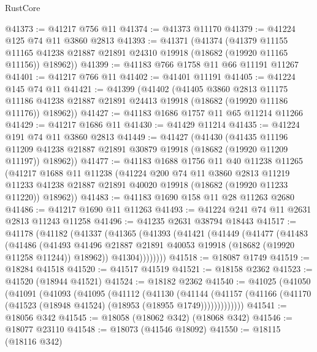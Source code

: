 \begin{lexlean}{RustCore}
\begin{coremodule}
@41373 := @41217 @756 @11
@41374 := @41373 @11170
@41379 := @41224 @125 @74 @11 @3860 @2813
@41393 := @41371
    (@41374
      (@41379
        @11155
        @11165
        @41238
        @21887
        @21891
        @24310
        @19918
        (@18682 (@19920 @11165 @11156))
        @18962))
@41399 := @41183 @766 @1758 @11 @66 @11191 @11267
@41401 := @41217 @766 @11
@41402 := @41401 @11191
@41405 := @41224 @145 @74 @11
@41421 := @41399
    (@41402
      (@41405
        @3860
        @2813
        @11175
        @11186
        @41238
        @21887
        @21891
        @24413
        @19918
        (@18682 (@19920 @11186 @11176))
        @18962))
@41427 := @41183 @1686 @1757 @11 @65 @11214 @11266
@41429 := @41217 @1686 @11
@41430 := @41429 @11214
@41435 := @41224 @191 @74 @11 @3860 @2813
@41449 := @41427
    (@41430
      (@41435
        @11196
        @11209
        @41238
        @21887
        @21891
        @30879
        @19918
        (@18682 (@19920 @11209 @11197))
        @18962))
@41477 := @41183
    @1688
    @1756
    @11
    @40
    @11238
    @11265
    (@41217
      @1688
      @11
      @11238
      (@41224
        @200
        @74
        @11
        @3860
        @2813
        @11219
        @11233
        @41238
        @21887
        @21891
        @40020
        @19918
        (@18682 (@19920 @11233 @11220))
        @18962))
@41483 := @41183 @1690 @158 @11 @28 @11263 @2680
@41486 := @41217 @1690 @11 @11263
@41493 := @41224 @241 @74 @11 @2631 @2813 @11243 @11258
@41496 := @41235 @2631 @38794 @18443
@41517 := @41178
    (@41182
      (@41337
        (@41365
          (@41393
            (@41421
              (@41449
                (@41477
                  (@41483
                    (@41486
                      (@41493
                        @41496
                        @21887
                        @21891
                        @40053
                        @19918
                        (@18682 (@19920 @11258 @11244))
                        @18962))
                    @41304))))))))
@41518 := @18087 @1749
@41519 := @18284 @41518
@41520 := @41517 @41519
@41521 := @18158 @2362
@41523 := @41520 (@18944 @41521)
@41524 := @18182 @2362
@41540 := @41025
    (@41050
      (@41091
        (@41093
          (@41095
            (@41112
              (@41130
                (@41144
                  (@41157 (@41166 (@41170 (@41523 (@18948 @41524) (@18953 (@18955 @1749)))))))))))))
@41541 := @18056 @342
@41545 := @18058 (@18062 @342) (@18068 @342)
@41546 := @18077 @23110
@41548 := @18073 (@41546 @18092)
@41550 := @18115 (@18116 @342)

\end{coremodule}
\end{lexlean}
